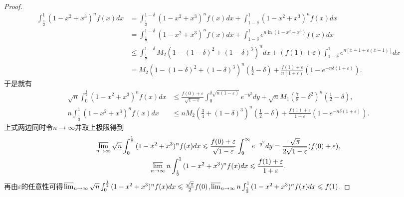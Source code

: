 \documentclass[../../main.tex]{subfiles}
\begin{document}
\begin{proof}
\begin{align*}
\int_{\frac{1}{2}}^1{(1 - x^2 + x^3)^nf(x)dx}&=\int_{\frac{1}{2}}^{1 - \delta}{(1 - x^2 + x^3)^nf(x)dx}+\int_{1 - \delta}^1{(1 - x^2 + x^3)^nf(x)dx}\\
&=\int_{\frac{1}{2}}^{1 - \delta}{(1 - x^2 + x^3)^nf(x)dx}+\int_{1 - \delta}^1{e^{n\ln(1 - x^2 + x^3)}f(x)dx}\\
&\leqslant \int_{\frac{1}{2}}^{1 - \delta}{M_2\left(1-(1-\delta)^2+(1 - \delta)^3\right)^ndx}+(f(1) + \varepsilon)\int_{1 - \delta}^1{e^{n[x - 1 + \varepsilon(x - 1)]}dx}\\
&=M_2\left(1-(1-\delta)^2+(1 - \delta)^3\right)^n\left(\frac{1}{2}-\delta\right)+\frac{f(1) + \varepsilon}{n(1 + \varepsilon)}\left(1 - e^{-n\delta(1 + \varepsilon)}\right).
\end{align*}
于是就有
\begin{align*}
\sqrt{n}\int_0^{\frac{1}{2}}{(1 - x^2 + x^3)^nf(x)dx}&\leqslant \frac{f(0) + \varepsilon}{\sqrt{1 - \varepsilon}}\int_0^{\delta\sqrt{n(1 - \varepsilon)}}{e^{-y^2}dy}+\sqrt{n} M_1\left(\frac{7}{8}-\delta^2\right)^n\left(\frac{1}{2}-\delta\right),\\
n\int_{\frac{1}{2}}^1{(1 - x^2 + x^3)^nf(x)dx}&\leqslant n M_2\left(\frac{3}{4}+(1 - \delta)^3\right)^n\left(\frac{1}{2}-\delta\right)+\frac{f(1) + \varepsilon}{1 + \varepsilon}\left(1 - e^{-n\delta(1 + \varepsilon)}\right).
\end{align*}
上式两边同时令\(n\rightarrow\infty\)并取上极限得到
\begin{gather*}
\varlimsup_{n\rightarrow\infty}\sqrt{n}\int_0^{\frac{1}{2}}{(1 - x^2 + x^3)^nf(x)dx}\leqslant \frac{f(0) + \varepsilon}{\sqrt{1 - \varepsilon}}\int_0^{\infty}{e^{-y^2}dy}=\frac{\sqrt{\pi}}{2\sqrt{1 - \varepsilon}}(f(0) + \varepsilon),\\
\varlimsup_{n\rightarrow\infty}n\int_{\frac{1}{2}}^1{(1 - x^2 + x^3)^nf(x)dx}\leqslant \frac{f(1) + \varepsilon}{1 + \varepsilon}.
\end{gather*}
再由\(\varepsilon\)的任意性可得\(\varlimsup_{n\rightarrow\infty}\sqrt{n}\int_0^{\frac{1}{2}}{(1 - x^2 + x^3)^nf(x)dx}\leqslant \frac{\sqrt{\pi}}{2}f(0)\),\(\varlimsup_{n\rightarrow\infty}n\int_{\frac{1}{2}}^1{(1 - x^2 + x^3)^nf(x)dx}\leqslant f(1)\).


\end{proof}
\end{document}
